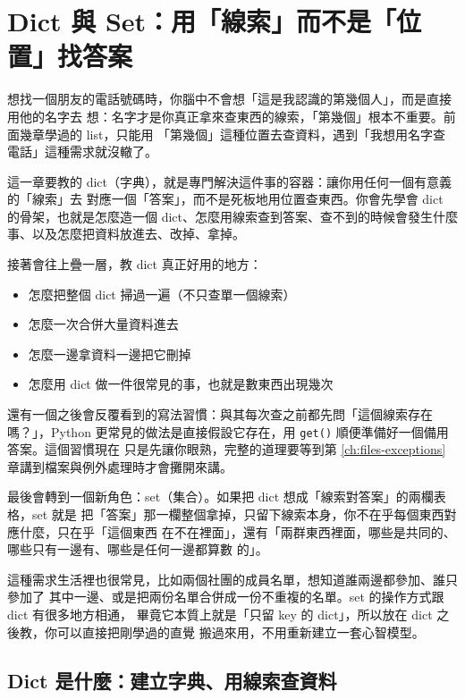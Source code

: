 \chapter{Dict 與 Set：用「線索」而不是「位置」找答案}
\label{ch:dict-set}

想找一個朋友的電話號碼時，你腦中不會想「這是我認識的第幾個人」，而是直接用他的名字去
想：名字才是你真正拿來查東西的線索，「第幾個」根本不重要。前面幾章學過的 list，只能用
「第幾個」這種位置去查資料，遇到「我想用名字查電話」這種需求就沒轍了。

這一章要教的 dict（字典），就是專門解決這件事的容器：讓你用任何一個有意義的「線索」去
對應一個「答案」，而不是死板地用位置查東西。你會先學會 dict 的骨架，也就是怎麼造一個
dict、怎麼用線索查到答案、查不到的時候會發生什麼事、以及怎麼把資料放進去、改掉、拿掉。

接著會往上疊一層，教 dict 真正好用的地方：

\begin{itemize}
\item 怎麼把整個 dict 掃過一遍（不只查單一個線索）
\item 怎麼一次合併大量資料進去
\item 怎麼一邊拿資料一邊把它刪掉
\item 怎麼用 dict 做一件很常見的事，也就是數東西出現幾次
\end{itemize}

還有一個之後會反覆看到的寫法習慣：與其每次查之前都先問「這個線索存在嗎？」，Python
更常見的做法是直接假設它存在，用 \texttt{get()} 順便準備好一個備用答案。這個習慣現在
只是先讓你眼熟，完整的道理要等到第 \ref{ch:files-exceptions} 章講到檔案與例外處理時才會攤開來講。

最後會轉到一個新角色：set（集合）。如果把 dict 想成「線索對答案」的兩欄表格，set 就是
把「答案」那一欄整個拿掉，只留下線索本身，你不在乎每個東西對應什麼，只在乎「這個東西
在不在裡面」，還有「兩群東西裡面，哪些是共同的、哪些只有一邊有、哪些是任何一邊都算數
的」。

這種需求生活裡也很常見，比如兩個社團的成員名單，想知道誰兩邊都參加、誰只參加了
其中一邊、或是把兩份名單合併成一份不重複的名單。set 的操作方式跟 dict 有很多地方相通，
畢竟它本質上就是「只留 key 的 dict」，所以放在 dict 之後教，你可以直接把剛學過的直覺
搬過來用，不用重新建立一套心智模型。

\section{Dict 是什麼：建立字典、用線索查資料}
\label{sec:dict-basics}

